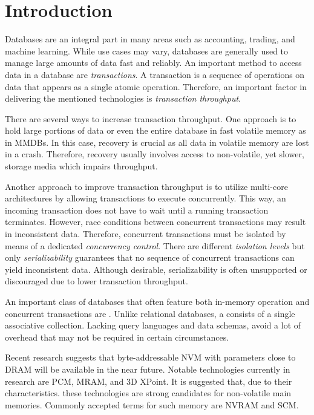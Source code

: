 \chapter{Introduction}
\label{ch:intro}


Databases are an integral part in many areas such as accounting, trading, and
machine learning. While use cases may vary, databases are generally used to
manage large amounts of data fast and reliably. An important method to access
data in a database are \emph{transactions}. A transaction is a sequence of
operations on data that appears as a single atomic operation. Therefore, an
important factor in delivering the mentioned technologies is \emph{transaction
throughput}.

There are several ways to increase transaction throughput. One approach is to
hold large portions of data or even the entire database in fast volatile memory
as in \acp{MMDB}. In this case, recovery is crucial as all data in volatile
memory are lost in a crash. Therefore, recovery usually involves access to
non-volatile, yet slower, storage media which impairs throughput.

Another approach to improve transaction throughput is to utilize multi-core
architectures by allowing transactions to execute concurrently. This way, an
incoming transaction does not have to wait until a running transaction
terminates. However, race conditions between concurrent transactions may result
in inconsistent data. Therefore, concurrent transactions must be isolated by
means of a dedicated \emph{concurrency control}. There are different
\emph{isolation levels} but only \emph{serializability} guarantees that no
sequence of concurrent transactions can yield inconsistent data. Although
desirable, serializability is often unsupported or discouraged due to lower
transaction throughput.

An important class of databases that often feature both in-memory operation and
concurrent transactions are \emph{\kvsp}. Unlike relational databases, a \kvs
consists of a single associative collection. Lacking query languages and data
schemas, \kvsp avoid a lot of overhead that may not be required in certain
circumstances.


Recent research suggests that byte-addressable \ac{NVM} with parameters close to
\ac{DRAM} will be available in the near future. Notable technologies currently
in research are \ac{PCM}, \ac{MRAM}, and 3D XPoint. It is suggested that, due to
their characteristics. these technologies are strong candidates for non-volatile
main memories. Commonly accepted terms for such memory are \ac{NVRAM} and
\ac{SCM}.


